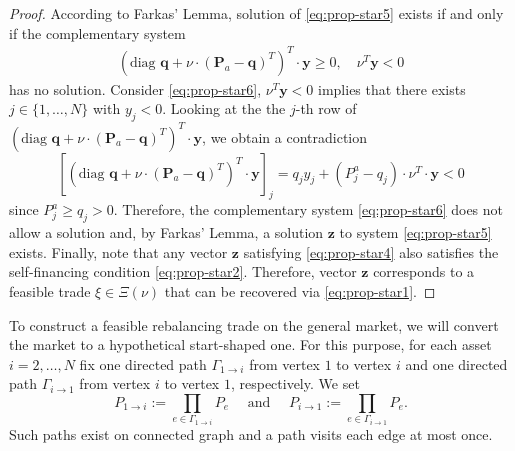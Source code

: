 \documentclass{article}
\theoremstyle{definition}
\def\bz{\mathbf{z}}
\def\by{\mathbf{y}}
\def\bq{\mathbf{q}}
\def\bP{\mathbf{P}}
\begin{document}
\begin{proof}
According to Farkas' Lemma, solution of \eqref{eq:prop-star5} exists if and only if the complementary system
\begin{align} \label{eq:prop-star6}
\left( \text{diag } \bq + \nu \cdot (\bP_a - \bq)^T \right)^T \cdot \by \geq 0, \quad \nu^T \by < 0
\end{align}
has no solution. Consider \eqref{eq:prop-star6}, $\nu^T \by < 0$ implies that there exists $j \in \{1, \dots, N\}$ with $y_j < 0$. Looking at the the $j$-th row of $\left( \text{diag } \bq + \nu \cdot (\bP_a - \bq)^T \right)^T \cdot \by$, we obtain a contradiction
\[
\left[\left( \text{diag } \bq + \nu \cdot (\bP_a - \bq)^T \right)^T \cdot \by \right]_j =  q_j y_j + (P^a_j - q_j) \cdot \nu^T \cdot \by < 0
\]
since $P^a_j \geq  q_j > 0$.
Therefore, the complementary system \eqref{eq:prop-star6} does not allow a solution and, by Farkas' Lemma, a solution $\bz$ to system \eqref{eq:prop-star5} exists. Finally, note that any vector $\bz$ satisfying \eqref{eq:prop-star4} also satisfies the self-financing condition \eqref{eq:prop-star2}. Therefore, vector $\bz$ corresponds to a feasible trade $\xi \in \Xi(\nu)$ that can be recovered via \eqref{eq:prop-star1}. 
\end{proof}

To construct a feasible rebalancing trade on the general market, we will convert the market to a hypothetical start-shaped one. For this purpose, for each asset $i=2, \dots, N$ fix one directed path $\Gamma_{1 \to i}$ from vertex $1$ to vertex $i$ and one directed path $\Gamma_{i \to 1}$ from vertex $i$ to vertex $1$, respectively. We set
\[
P_{1 \to i} := \prod_{e \in \Gamma_{1 \to i}} P_e \quad \text{ and } \quad P_{i \to 1} := \prod_{e \in \Gamma_{i \to 1}} P_e.
\]
Such paths exist on connected graph and a path visits each edge at most once.
\end{document}
